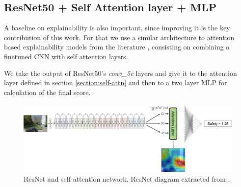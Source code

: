 \subsection{ResNet50 + Self Attention layer + MLP}

A baseline on explainability is also important, since improving it is the key contribution
of this work. For that we use a similar architecture to attention based explainability
models from the literature \cite{zhang_interpretable, cordonnier_relationship, bello_attention}, consisting on
combining a finetuned CNN with self attention layers.

We take the output of ResNet50's \textit{conv\_5c} layers and give it to the attention layer
defined in section \ref{section:self-attn} and then to a two layer MLP for calculation of the final score.

\begin{figure}[ht]
	\begin{center}
	\includegraphics[width=1\textwidth]{./figures/attn_baseline.png}
	\caption[ResNet + SelfAttention]{ResNet and self attention network. ResNet diagram extracted from .}
	\label{fig:attn_resnet}
	\end{center}
\end{figure}